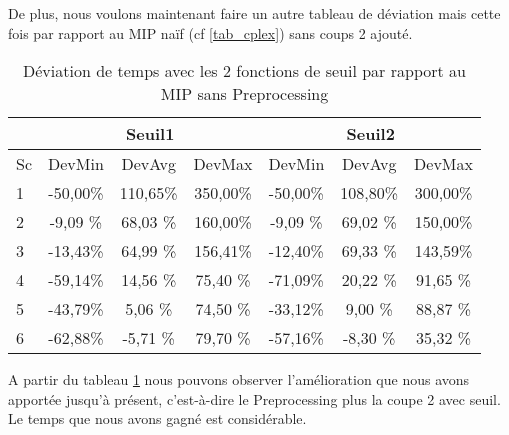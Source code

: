 \documentclass[twoside,fleqn]{EPURapport}
\begin{document}
De plus, nous voulons maintenant faire un autre tableau de déviation mais cette fois par rapport au MIP naïf (cf \ref{tab_cplex}) sans coups 2 ajouté.
\begin{table}[h]
    \centering
    \begin{tabular}{|l|c|c|c|c|c|c|}
    	\hline
  &\multicolumn{3}{c}{Seuil1}	&\multicolumn{3}{|c|}{Seuil2}\\ \hline
 Sc  & 	DevMin	& DevAvg	& DevMax& 	DevMin	& DevAvg	&DevMax  \\ \hline
1&	-50,00\%&	110,65\%&	350,00\%&	-50,00\%&	108,80\%&	300,00\%    \\ \hline
2&	-9,09 \%&	68,03 \%&	160,00\%&	-9,09 \%&	69,02 \%&	150,00\%     \\ \hline
3&	-13,43\%&	64,99 \%&	156,41\%&	-12,40\%&	69,33 \%&	143,59\%  \\ \hline
4&	-59,14\%&	14,56 \%&	75,40 \%&	-71,09\%&	20,22 \%&	91,65 \%    \\ \hline
5&	-43,79\%&	5,06	\%&74,50 \%&    -33,12\%&	9,00	\%&88,87  \%     \\ \hline
6&	-62,88\%&	-5,71 \%&	79,70 \%&	-57,16\%&	-8,30 \%&	35,32 \%  \\ \hline
    \end{tabular}
    \caption{Déviation de temps avec les 2 fonctions de seuil par rapport au MIP sans Preprocessing}
    \label{tab_cut2_seuil_tim_cmp2}
\end{table}
\bigskip

A partir du tableau \ref{tab_cut2_seuil_tim_cmp2} nous pouvons observer l'amélioration que nous avons apportée jusqu'à présent, c'est-à-dire le Preprocessing plus la coupe 2 avec seuil. Le temps que nous avons gagné est considérable.
\end{document}
